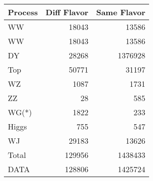 \begin{table}[ht]
	\centering
\begin{tabular}{lrr}

Process &  Diff Flavor &  Same Flavor \\
		\hline
     WW &        18043 &        13586 \\
     WW &        18043 &        13586 \\
     DY &        28268 &      1376928 \\
    Top &        50771 &        31197 \\
     WZ &         1087 &         1731 \\
     ZZ &           28 &          585 \\
  WG(*) &         1822 &          233 \\
  Higgs &          755 &          547 \\
     WJ &        29183 &        13626 \\
\hline
  Total &       129956 &      1438433 \\
   DATA &       128806 &      1425724 \\


\end{tabular}

\end{table}